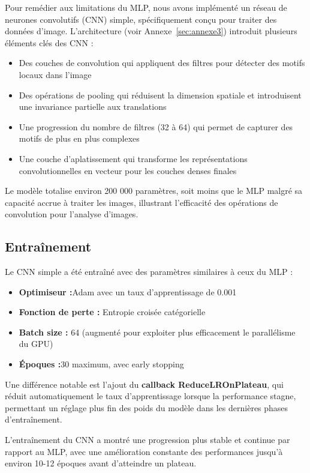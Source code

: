 \begin{flushleft}
Pour remédier aux limitations du MLP, nous avons implémenté un réseau de neurones convolutifs (CNN) simple, spécifiquement conçu pour traiter des données d'image. L'architecture (voir Annexe~\ref{sec:annexe3}) introduit plusieurs éléments clés des CNN :

\begin{itemize}
\item Des couches de convolution qui appliquent des filtres pour détecter des motifs locaux dans l'image
\item Des opérations de pooling qui réduisent la dimension spatiale et introduisent une invariance partielle aux translations
\item Une progression du nombre de filtres (32 à 64) qui permet de capturer des motifs de plus en plus complexes
\item Une couche d'aplatissement qui transforme les représentations convolutionnelles en vecteur pour les couches denses finales
\end{itemize}
\bigskip
Le modèle totalise environ 200 000 paramètres, soit moins que le MLP malgré sa capacité accrue à traiter les images, illustrant l'efficacité des opérations de convolution pour l'analyse d'images.
\end{flushleft}

\subsection{Entraînement}
\begin{flushleft}
Le CNN simple a été entraîné avec des paramètres similaires à ceux du MLP :

\begin{itemize}
\item \textbf{Optimiseur :}Adam avec un taux d'apprentissage de 0.001
\item \textbf{Fonction de perte : }Entropie croisée catégorielle
\item \textbf{Batch size :} 64 (augmenté pour exploiter plus efficacement le parallélisme du GPU)
\item \textbf{Époques :}30 maximum, avec early stopping
\end{itemize}
\bigskip

Une différence notable est l'ajout du \textbf{callback ReduceLROnPlateau}, qui réduit automatiquement le taux d'apprentissage lorsque la performance stagne, permettant un réglage plus fin des poids du modèle dans les dernières phases d'entraînement.

\bigskip

L'entraînement du CNN a montré une progression plus stable et continue par rapport au MLP, avec une amélioration constante des performances jusqu'à environ 10-12 époques avant d'atteindre un plateau.
\end{flushleft}

